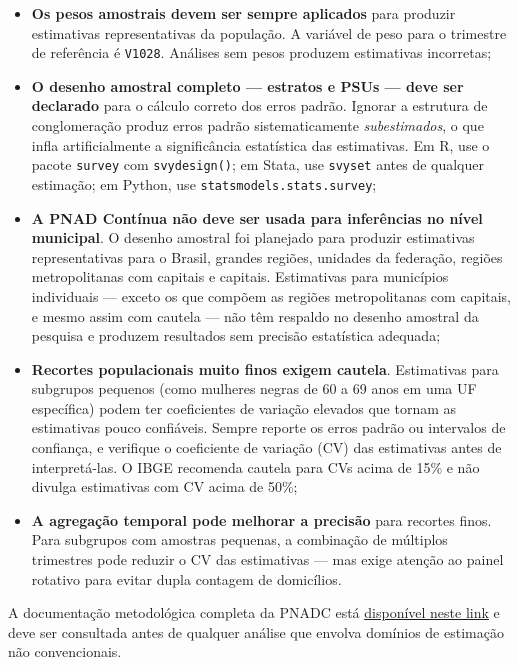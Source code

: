 \begin{itemize}
  \item \textbf{Os pesos amostrais devem ser sempre aplicados} para produzir estimativas representativas da população. A variável de peso para o trimestre de referência é \texttt{V1028}. Análises sem pesos produzem estimativas incorretas;

  \item \textbf{O desenho amostral completo --- estratos e PSUs --- deve ser declarado} para o cálculo correto dos erros padrão. Ignorar a estrutura de conglomeração produz erros padrão sistematicamente \textit{subestimados}, o que infla artificialmente a significância estatística das estimativas. Em R, use o pacote \texttt{survey} com \texttt{svydesign()}; em Stata, use \texttt{svyset} antes de qualquer estimação; em Python, use \texttt{statsmodels.stats.survey};

  \item \textbf{A PNAD Contínua não deve ser usada para inferências no nível municipal}. O desenho amostral foi planejado para produzir estimativas representativas para o Brasil, grandes regiões, unidades da federação, regiões metropolitanas com capitais e capitais. Estimativas para municípios individuais --- exceto os que compõem as regiões metropolitanas com capitais, e mesmo assim com cautela --- não têm respaldo no desenho amostral da pesquisa e produzem resultados sem precisão estatística adequada;

  \item \textbf{Recortes populacionais muito finos exigem cautela}. Estimativas para subgrupos pequenos (como mulheres negras de 60 a 69 anos em uma UF específica) podem ter coeficientes de variação elevados que tornam as estimativas pouco confiáveis. Sempre reporte os erros padrão ou intervalos de confiança, e verifique o coeficiente de variação (CV) das estimativas antes de interpretá-las. O IBGE recomenda cautela para CVs acima de 15\% e não divulga estimativas com CV acima de 50\%;

  \item \textbf{A agregação temporal pode melhorar a precisão} para recortes finos. Para subgrupos com amostras pequenas, a combinação de múltiplos trimestres pode reduzir o CV das estimativas --- mas exige atenção ao painel rotativo para evitar dupla contagem de domicílios.
\end{itemize}

A documentação metodológica completa da PNADC está \href{ftp://ftp.ibge.gov.br/Trabalho_e_Rendimento/Pesquisa_Nacional_por_Amostra_de_Domicilios_continua/Notas_metodologicas/notas_metodologicas.pdf}{disponível neste link} e deve ser consultada antes de qualquer análise que envolva domínios de estimação não convencionais.

